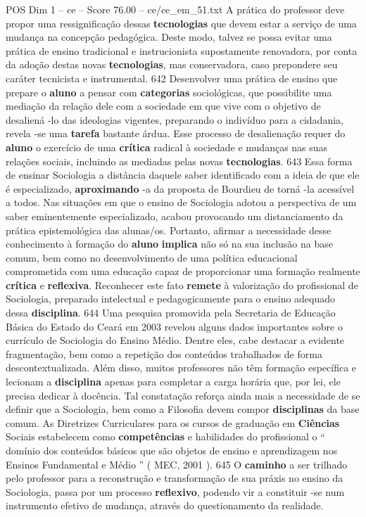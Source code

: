 \begin{textsample}{POS Dim 1 – ce – Score 76.00 – ce/ce\_em\_51.txt}
A prática do professor deve propor uma ressignificação dessas \textbf{tecnologias} que devem estar a serviço de uma mudança na concepção pedagógica.
Deste modo, talvez se possa evitar uma prática de ensino tradicional e instrucionista supostamente renovadora, por conta da adoção destas novas \textbf{tecnologias}, mas conservadora, caso prepondere seu caráter tecnicista e instrumental. 642 Desenvolver uma prática de ensino que prepare o \textbf{aluno} a pensar com \textbf{categorias} sociológicas, que possibilite uma mediação da relação dele com a sociedade em que vive com o objetivo de desaliená -lo das ideologias vigentes, preparando o indivíduo para a cidadania, revela -se uma \textbf{tarefa} bastante árdua.
Esse processo de desalienação requer do \textbf{aluno} o exercício de uma \textbf{crítica} radical à sociedade e mudanças nas suas relações sociais, incluindo as mediadas pelas novas \textbf{tecnologias}. 643 Essa forma de ensinar Sociologia a distância daquele saber identificado com a ideia de que ele é especializado, \textbf{aproximando} -a da proposta de Bourdieu de torná -la acessível a todos.
Nas situações em que o ensino de Sociologia adotou a perspectiva de um saber eminentemente especializado, acabou provocando um distanciamento da prática epistemológica das alunas/os.
Portanto, afirmar a necessidade desse conhecimento à formação do \textbf{aluno} \textbf{implica} não só na sua inclusão na base comum, bem como no desenvolvimento de uma política educacional comprometida com uma educação capaz de proporcionar uma formação realmente \textbf{crítica} e \textbf{reflexiva}.
Reconhecer este fato \textbf{remete} à valorização do profissional de Sociologia, preparado intelectual e pedagogicamente para o ensino adequado dessa \textbf{disciplina}. 644 Uma pesquisa promovida pela Secretaria de Educação Básica do Estado do Ceará em 2003 revelou alguns dados importantes sobre o currículo de Sociologia do Ensino Médio.
Dentre eles, cabe destacar a evidente fragmentação, bem como a repetição dos conteúdos trabalhados de forma descontextualizada.
Além disso, muitos professores não têm formação específica e lecionam a \textbf{disciplina} apenas para completar a carga horária que, por lei, ele precisa dedicar à docência.
Tal constatação reforça ainda mais a necessidade de se definir que a Sociologia, bem como a Filosofia devem compor \textbf{disciplinas} da base comum.
As Diretrizes Curriculares para os cursos de graduação em \textbf{Ciências} Sociais estabelecem como \textbf{competências} e habilidades do profissional o “ domínio dos conteúdos básicos que são objetos de ensino e aprendizagem nos Ensinos Fundamental e Médio ” ( MEC, 2001 ). 645 O \textbf{caminho} a ser trilhado pelo professor para a reconstrução e transformação de sua práxis no ensino da Sociologia, passa por um processo \textbf{reflexivo}, podendo vir a constituir -se num instrumento efetivo de mudança, através do questionamento da realidade.

\end{textsample}
